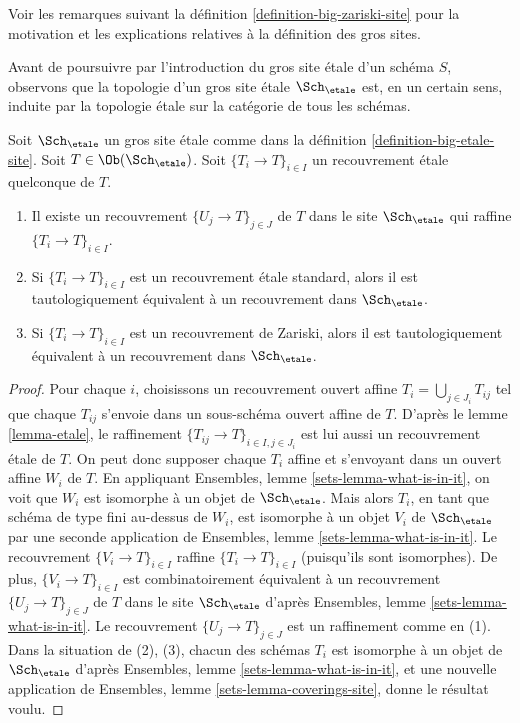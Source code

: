 \noindent
Voir les remarques suivant la définition \ref{definition-big-zariski-site}
pour la motivation et les explications relatives à la définition des gros sites.

\medskip\noindent
Avant de poursuivre par l'introduction du gros site étale d'un
schéma $S$, observons que la topologie d'un gros site étale
$\Sch_\etale$ est, en un certain sens, induite par la topologie
étale sur la catégorie de tous les schémas.

\begin{lemma}
\label{lemma-etale-induced}
Soit $\Sch_\etale$ un gros site étale comme dans la
définition \ref{definition-big-etale-site}.
Soit $T \in \Ob(\Sch_\etale)$.
Soit $\{T_i \to T\}_{i \in I}$ un recouvrement étale quelconque de $T$.
\begin{enumerate}
\item Il existe un recouvrement $\{U_j \to T\}_{j \in J}$ de $T$ dans le site
$\Sch_\etale$ qui raffine $\{T_i \to T\}_{i \in I}$.
\item Si $\{T_i \to T\}_{i \in I}$ est un recouvrement étale standard, alors
il est tautologiquement équivalent à un recouvrement dans $\Sch_\etale$.
\item Si $\{T_i \to T\}_{i \in I}$ est un recouvrement de Zariski, alors
il est tautologiquement équivalent à un recouvrement dans $\Sch_\etale$.
\end{enumerate}
\end{lemma}

\begin{proof}
Pour chaque $i$, choisissons un recouvrement ouvert affine $T_i = \bigcup_{j \in J_i} T_{ij}$
tel que chaque $T_{ij}$ s'envoie dans un sous-schéma ouvert affine de $T$. D'après le
lemme \ref{lemma-etale},
le raffinement $\{T_{ij} \to T\}_{i \in I, j \in J_i}$ est lui aussi un recouvrement étale
de $T$. On peut donc supposer chaque $T_i$ affine et s'envoyant dans
un ouvert affine $W_i$ de $T$. En appliquant
Ensembles, lemme \ref{sets-lemma-what-is-in-it},
on voit que $W_i$ est isomorphe à un objet de $\Sch_\etale$.
Mais alors $T_i$, en tant que schéma de type fini au-dessus de $W_i$,
est isomorphe à un objet $V_i$ de $\Sch_\etale$ par une seconde
application de
Ensembles, lemme \ref{sets-lemma-what-is-in-it}.
Le recouvrement $\{V_i \to T\}_{i \in I}$ raffine $\{T_i \to T\}_{i \in I}$
(puisqu'ils sont isomorphes).
De plus, $\{V_i \to T\}_{i \in I}$ est combinatoirement équivalent à un
recouvrement $\{U_j \to T\}_{j \in J}$ de $T$ dans le site
$\Sch_\etale$ d'après
Ensembles, lemme \ref{sets-lemma-what-is-in-it}.
Le recouvrement $\{U_j \to T\}_{j \in J}$ est un raffinement comme en (1).
Dans la situation de (2), (3), chacun des
schémas $T_i$ est isomorphe à un objet de $\Sch_\etale$ d'après
Ensembles, lemme \ref{sets-lemma-what-is-in-it},
et une nouvelle application de
Ensembles, lemme \ref{sets-lemma-coverings-site},
donne le résultat voulu.
\end{proof}


